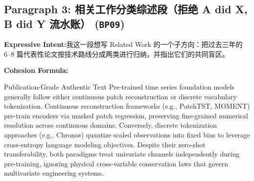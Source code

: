 \subsection*{Paragraph 3: 相关工作分类综述段（拒绝 A did X, B did Y 流水账） (\texttt{BP09})}
\noindent\textbf{Expressive Intent:}\enspace 我这一段想写 Related Work 的一个子方向：把过去三年的 6--8 篇代表性论文按技术路线分成两类进行归纳，并指出它们的共同盲区。\par
\noindent\textbf{Cohesion Formula:}\par\vspace{4pt}
\begin{ExampleBox}{Publication-Grade Authentic Text}
Pre-trained time series foundation models generally follow either continuous patch reconstruction or discrete vocabulary tokenization. Continuous reconstruction frameworks (e.g., PatchTST, MOMENT) pre-train encoders via masked patch regression, preserving fine-grained numerical resolution across continuous domains. Conversely, discrete tokenization approaches (e.g., Chronos) quantize scaled observations into fixed bins to leverage cross-entropy language modeling objectives. Despite their zero-shot transferability, both paradigms treat univariate channels independently during pre-training, ignoring physical cross-variable conservation laws that govern multivariate engineering systems.
\end{ExampleBox}
